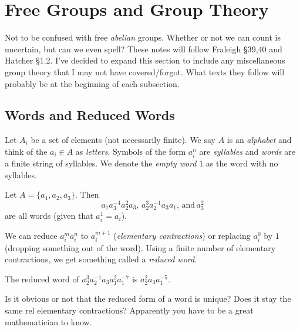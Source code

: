 \section{Free Groups and Group Theory}
Not to be confused with free \emph{abelian} groups. Whether or not we can count is uncertain, but can we even spell? These notes will follow Fraleigh \S 39,40 and Hatcher \S 1.2.
\orbreak
I've decided to expand this section to include any miscellaneous group theory that I may not have covered/forgot. What texts they follow will probably be at the beginning of each subsection.
\subsection{Words and Reduced Words}
Let $A_i$ be a set of elements (not necessarily finite). We say $A$ is an \emph{alphabet} and think of the $a_i\in A$ as \emph{letters}. Symbols of the form $a_{i}^{n}$ are \emph{syllables} and \emph{words} are a finite string of syllables. We denote the \emph{empty word} $1$ as the word with no syllables.
\begin{example}
    Let $A=\{a_1,a_2,a_3\}.$ Then \[
        a_1a_3^{-4}a_2^{2}a_3, \, a_2^{3}a_2^{-1}a_3a_1, \, \text{and} \, a_3^2
    \] are all words (given that $a_i^{1}=a_i$).
\end{example}
We can reduce $a_i^{m}a_i^n$ to $a_i^{m+1}$ (\emph{elementary contractions}) or replacing $a_i^{0}$ by $1$ (dropping something out of the word). Using a finite number of elementary contractions, we get something called a \emph{reduced word}.
\begin{example}
    The reduced word of $a_2^{3}a_2^{-1}a_3a_1^2a_1^{-7}$ is $a_2^2a_3a_1^{-5}$.
\end{example}
Is it obvious or not that the reduced form of a word is unique? Does it stay the same rel elementary contractions? Apparently you have to be a great mathematician to know.
